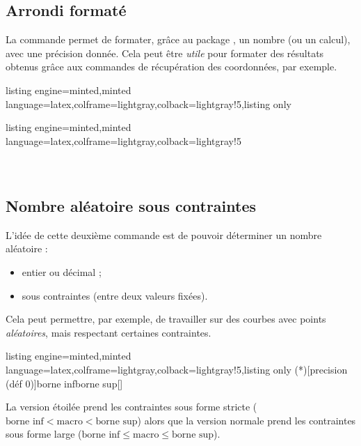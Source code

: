 \documentclass[11pt,a4paper]{ltxdoc}
\begin{document}
\subsection{Arrondi formaté}\label{numarrond}

La commande  permet de formater, grâce au package , un nombre (ou un calcul), avec une précision donnée. Cela peut être \textit{utile} pour formater des résultats obtenus grâce aux commandes de récupération des coordonnées, par exemple.

\begin{tcblisting}{listing engine=minted,minted language=latex,colframe=lightgray,colback=lightgray!5,listing only}
\end{tcblisting}

\begin{tcblisting}{listing engine=minted,minted language=latex,colframe=lightgray,colback=lightgray!5}
\\
\\
\\
\end{tcblisting}

\subsection{Nombre aléatoire sous contraintes}\label{nbalea}

L'idée de cette deuxième commande est de pouvoir déterminer un nombre aléatoire :

\begin{itemize}
	\item entier ou décimal ;
	\item sous contraintes (entre deux valeurs fixées).
\end{itemize}

Cela peut permettre, par exemple, de travailler sur des courbes avec points \textit{aléatoires}, mais respectant certaines contraintes.

\begin{tcblisting}{listing engine=minted,minted language=latex,colframe=lightgray,colback=lightgray!5,listing only}
\ChoisirNbAlea(*)[precision (déf 0)]{borne inf}{borne sup}[\macro]
\end{tcblisting}

La version étoilée prend les contraintes sous forme stricte ($\text{borne inf} < \text{macro} < \text{borne sup}$) alors que la version normale prend les contraintes sous forme large ($\text{borne inf} \leq \text{macro} \leq \text{borne sup}$).
\end{document}
